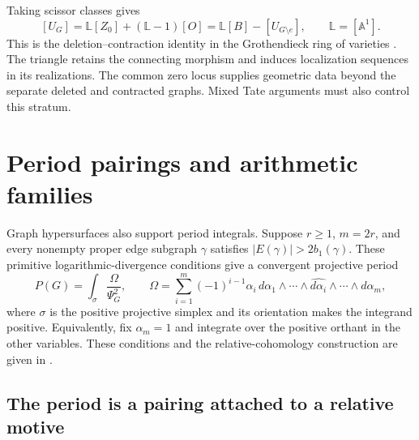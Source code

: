 \documentclass[11pt]{article}
\theoremstyle{definition}
\theoremstyle{remark}
\newcommand{\A}{\mathbb A}
\begin{document}
Taking scissor classes gives
\[
 [U_G]=\mathbb L[Z_0]+(\mathbb L-1)[O]
      =\mathbb L[B]-[U_{G\setminus e}],\qquad\mathbb L=[\A^1].
\]
This is the deletion--contraction identity in the Grothendieck ring of
varieties \cite[Theorem 3.8]{AluffiMarcolliDeletionContraction}.
The triangle retains the connecting morphism and induces localization
sequences in its realizations. The common zero locus supplies geometric
data beyond the separate deleted and contracted graphs. Mixed Tate
arguments must also control this stratum.

\section{Period pairings and arithmetic families}
\label{sec:graph-period-families}

Graph hypersurfaces also support period integrals. Suppose $r\ge1$, $m=2r$, and every nonempty proper edge subgraph $\gamma$ satisfies $|E(\gamma)|>2b_1(\gamma)$. These primitive logarithmic-divergence conditions give a convergent projective period
\[
  P(G)=\int_{\sigma}\frac{\Omega}{\Psi_G^2},\qquad
  \Omega=\sum_{i=1}^{m}(-1)^{i-1}\alpha_i\,
     d\alpha_1\wedge\cdots\wedge\widehat{d\alpha_i}
     \wedge\cdots\wedge d\alpha_m,
\]
where $\sigma$ is the positive projective simplex and its orientation
makes the integrand positive.  Equivalently, fix $\alpha_m=1$ and
integrate over the positive orthant in the other variables.  These
conditions and the relative-cohomology construction are given in
\cite[\S5, \S7]{BEKGraphPolynomials}.

\subsection{The period is a pairing attached to a relative motive}
\label{sec:derived-relative-period}
\end{document}
